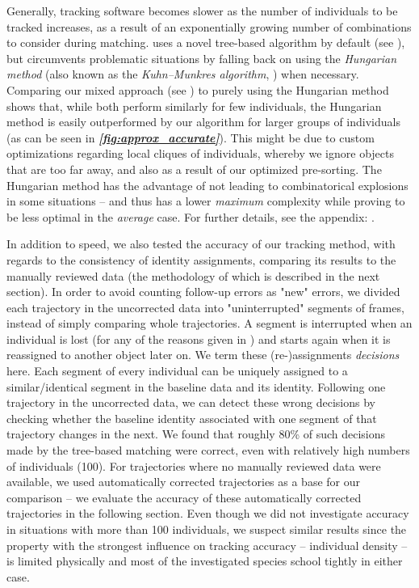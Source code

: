 \documentclass[9pt,lineno]{elife}
\newcommand{\figref}[1]{\textit{\textbf{\ref{#1}}}}
\newcommand{\TRex}{\protect\path{TRex}}
\begin{document}
Generally, tracking software becomes slower as the number of individuals to be tracked increases, as a result of an exponentially growing number of combinations to consider during matching. {\color{blue}\TRex{} uses a novel tree-based algorithm by default (see ), but circumvents problematic situations by falling back on using the \textit{Hungarian method} (also known as the \textit{Kuhn–Munkres algorithm}, \cite{kuhn1955hungarian})} when necessary. Comparing our mixed approach (see ) to purely using the Hungarian method shows that, while both perform similarly for few individuals, the Hungarian method is easily outperformed by our algorithm for larger groups of individuals (as can be seen in \figref{fig:approx_accurate}). This might be due to custom optimizations regarding local cliques of individuals, whereby we ignore objects that are too far away, and also as a result of our optimized pre-sorting. The Hungarian method has the advantage of not leading to combinatorical explosions in some situations -- and thus has a lower \textit{maximum} complexity while proving to be less optimal in the \textit{average} case. For further details, see the appendix: .

 \label{sec:evaluation_accuracy}
In addition to speed, we also tested the accuracy of our tracking method, with regards to the consistency of identity assignments, comparing its results to the manually reviewed data (the methodology of which is described in the next section). In order to avoid counting follow-up errors as "new" errors, we divided each trajectory in the uncorrected data into "uninterrupted" segments of frames, instead of simply comparing whole trajectories. A segment is interrupted when an individual is lost (for any of the reasons given in ) and starts again when it is reassigned to another object later on. We term these (re-)assignments \textit{decisions} here. Each segment of every individual can be uniquely assigned to a similar/identical segment in the baseline data and its identity. Following one trajectory in the uncorrected data, we can detect these wrong decisions by checking whether the baseline identity associated with one segment of that trajectory changes in the next. We found that roughly 80\% of such decisions made by the tree-based matching were correct, even with relatively high numbers of individuals (100). For trajectories where no manually reviewed data were available, we used automatically corrected trajectories as a base for our comparison -- we evaluate the accuracy of these automatically corrected trajectories in the following section. Even though we did not investigate accuracy in situations with more than 100 individuals, we suspect similar results since the property with the strongest influence on tracking accuracy -- individual density -- is limited physically and most of the investigated species school tightly in either case.
\end{document}

